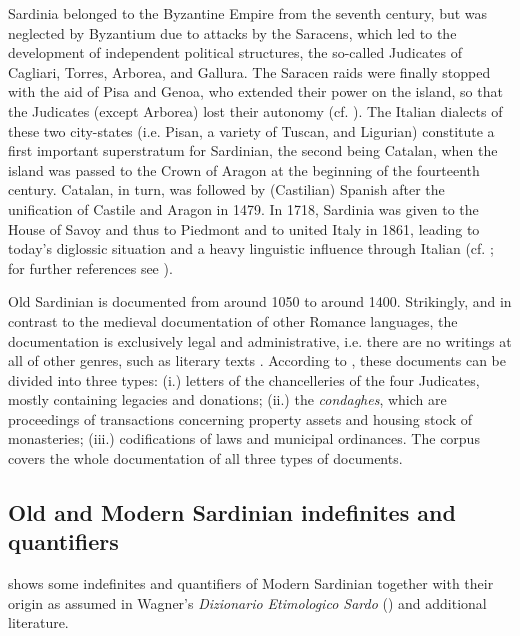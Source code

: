 \documentclass[output=paper,colorlinks,citecolor=brown]{langscibook}
\begin{document}
Sardinia belonged to the Byzantine Empire from the seventh century, but was neglected by Byzantium due to  attacks by the Saracens, which led to the development of independent political structures, the so-called Judicates of Cagliari, Torres, Arborea, and Gallura. The Saracen raids were finally stopped with the aid of Pisa and Genoa, who extended their power on the island, so that the Judicates (except Arborea) lost their autonomy (cf. \cite[][270]{MenschingRemberger2016}). The Italian dialects of these two city-states (i.e. Pisan, a variety of Tuscan, and Ligurian) constitute a first important superstratum for Sardinian, the second being Catalan, when the island was passed to the Crown of Aragon at the beginning of the fourteenth century. Catalan, in turn, was followed by (Castilian) Spanish after the unification of Castile and Aragon in 1479. In 1718, Sardinia was given to the House of Savoy and thus to Piedmont and to united Italy in 1861, leading to today’s diglossic situation and a heavy linguistic influence through Italian (cf. \cite{Rindler-Schjerve1987}; for further references see \cite[][270--217]{MenschingRemberger2016}).

Old Sardinian is documented from around 1050 to around 1400. Strikingly, and in contrast to the medieval documentation of other Romance languages, the documentation is exclusively legal and administrative, i.e. there are no writings at all of other genres, such as literary texts \citep[][80--83]{Wagner1997}. According to \citet[][250--251]{BlascoFerrer1995}, these documents can be divided into three types: (i.) letters of the chancelleries of the four Judicates, mostly containing legacies and donations; (ii.) the \textit{condaghes}, which are proceedings of transactions concerning property assets and housing stock of monasteries; (iii.) codifications of laws and municipal ordinances. The  corpus covers the whole documentation of all three types of documents. 


\subsection{Old and Modern Sardinian indefinites and quantifiers}\label{sec:men2.2}
 shows some indefinites and quantifiers of Modern Sardinian together with their origin as assumed in Wagner’s \textit{Dizionario Etimologico Sardo} () and additional literature.
\end{document}
